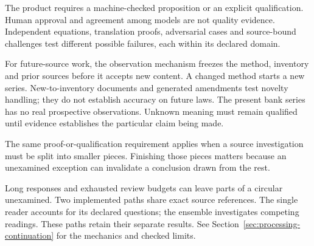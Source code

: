 The product requires a machine-checked proposition or an explicit qualification.
Human approval and agreement among models are not quality evidence. Independent
equations, translation proofs, adversarial cases and source-bound challenges
test different possible failures, each within its declared domain.

For future-source work, the observation mechanism freezes the method, inventory
and prior sources before it accepts new content. A changed method starts a new
series. New-to-inventory documents and generated amendments test novelty handling;
they do not establish accuracy on future laws. The present bank series has no
real prospective observations. Unknown meaning must remain qualified until
evidence establishes the particular claim being made.

\clearpage
{}
The same proof-or-qualification requirement applies when a source investigation
must be split into smaller pieces. Finishing those pieces matters because an
unexamined exception can invalidate a conclusion drawn from the rest.

Long responses and exhausted review budgets can leave parts of a circular
unexamined. Two implemented paths share exact source references. The single
reader accounts for its declared questions; the ensemble investigates competing
readings. These paths retain their separate results. See
Section~\ref{sec:processing-continuation} for the mechanics and checked limits.

